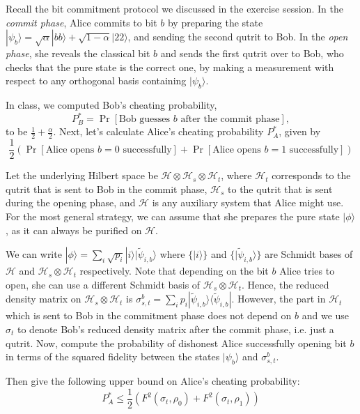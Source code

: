 \documentclass[a4paper,10pt,landscape,twocolumn]{scrartcl}
\newcommand{\ket}[1]{| #1 \rangle}
\newcommand{\bra}[1]{\langle #1 |}
\newcommand{\Hi}{\mathcal{H}}
\begin{document}
\begin{exercise}
Recall the bit commitment protocol we discussed in the exercise session. In the \emph{commit phase}, Alice commits to bit $b$ by preparing the state 
$\ket{\psi_b}= \sqrt{\alpha} \ket{bb} + \sqrt{1-\alpha} \ket{22}$, and sending the second qutrit to Bob. In the \emph{open phase}, she reveals the classical bit $b$ and sends the first qutrit over to Bob, who checks that the pure state is the correct one, by making a measurement with respect to any orthogonal basis containing $\ket{\psi_b}$.

In class, we computed Bob's cheating probability, \[P_B^*= \Pr[\text{Bob guesses $b$ after the commit phase}],\] to be $\frac{1}{2} + \frac{\alpha}{2}$. Next, let's calculate Alice's cheating probability $P_A^*$, given by
\[\frac12(\Pr[\text{Alice opens $b=0$ successfully}]+ \Pr[\text{Alice opens $b=1$ successfully}])\]

\begin{subex}
Let the underlying Hilbert space be $\Hi \otimes \Hi_s \otimes \Hi_t$, where $\Hi_t$ corresponds to the qutrit that is sent to Bob in the commit phase, $\Hi_s$ to the qutrit that is sent during the opening phase, and $\Hi$ is any auxiliary system that Alice might use. For the most general strategy, we can assume that she prepares the pure state $\ket{\phi}$, as it can always be purified on $\Hi$.

We can write $\ket{\phi} = \sum_i \sqrt{p_i} \ket{i} \ket{\tilde{\psi}_{i,b}}$ where $\{\ket{i}\}$ and $\{ \ket{\tilde{\psi}_{i,b}} \}$ are Schmidt bases of $\Hi$ and $\Hi_s \otimes \Hi_t$ respectively. Note that depending on the bit $b$ Alice tries to open, she can use a different Schmidt basis of $\Hi_s \otimes \Hi_t$. Hence, the reduced density matrix on $\Hi_s \otimes \Hi_t$ is $\sigma^b_{s,t} = \sum_i p_i \ket{\tilde{\psi}_{i,b}}\bra{\tilde{\psi}_{i,b}}$. However, the part in $\Hi_t$ which is sent to Bob in the commitment phase does not depend on $b$ and we use $\sigma_t$ to denote Bob's reduced density matrix after the commit phase, i.e. just a qutrit.
Now, compute the probability of dishonest Alice successfully opening bit $b$ in terms of the squared fidelity between the states $\ket{\psi_b}$ and $\sigma^b_{s,t}$.
\end{subex}

\begin{subex}
Then give the following upper bound on Alice's cheating probability:
\[
P_A^* \leq \frac12 \left( F^2(\sigma_t, \rho_0) + F^2(\sigma_t,\rho_1) \right)
\]


\end{subex}
\end{exercise}
\end{document}
